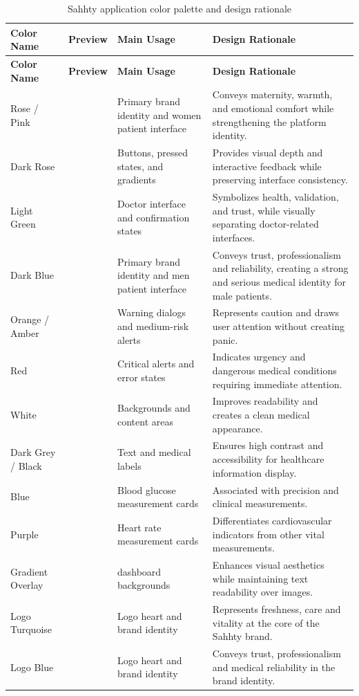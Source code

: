 \begin{longtable}{|p{2.5cm}|p{2cm}|p{3.5cm}|p{5.5cm}|}
\caption{Sahhty application color palette and design rationale}
\label{tab:colors} \\
\hline
\rowcolor{pink!15}
\textbf{Color Name} & \textbf{Preview} & \textbf{Main Usage} & \textbf{Design Rationale} \\
\hline
\endfirsthead
\hline
\rowcolor{pink!15}
\textbf{Color Name} & \textbf{Preview} & \textbf{Main Usage} & \textbf{Design Rationale} \\
\hline
\endhead
Rose / Pink &
\cellcolor[HTML]{E91E8C} &
Primary brand identity and women patient interface &
Conveys maternity, warmth, and emotional comfort while strengthening the platform identity. \\
\hline
Dark Rose &
\cellcolor[HTML]{C2185B} &
Buttons, pressed states, and gradients &
Provides visual depth and interactive feedback while preserving interface consistency. \\
\hline
Light Green &
\cellcolor[HTML]{A5D6A7} &
Doctor interface and confirmation states &
Symbolizes health, validation, and trust, while visually separating doctor-related interfaces. \\
\hline
Dark Blue &
\cellcolor[HTML]{0D47A1} &
Primary brand identity and men patient interface &
Conveys trust, professionalism and reliability, creating a strong and serious medical identity for male patients. \\
\hline
Orange / Amber &
\cellcolor[HTML]{FFB300} &
Warning dialogs and medium-risk alerts &
Represents caution and draws user attention without creating panic. \\
\hline
Red &
\cellcolor[HTML]{E53935} &
Critical alerts and error states &
Indicates urgency and dangerous medical conditions requiring immediate attention. \\
\hline
White &
\cellcolor[HTML]{FFFFFF} &
Backgrounds and content areas &
Improves readability and creates a clean medical appearance. \\
\hline
Dark Grey / Black &
\cellcolor[HTML]{424242} &
Text and medical labels &
Ensures high contrast and accessibility for healthcare information display. \\
\hline
Blue &
\cellcolor[HTML]{42A5F5} &
Blood glucose measurement cards &
Associated with precision and clinical measurements. \\
\hline
Purple &
\cellcolor[HTML]{8E24AA} &
Heart rate measurement cards &
Differentiates cardiovascular indicators from other vital measurements. \\
\hline
Gradient Overlay &
\cellcolor[HTML]{D1C4E9} &
dashboard backgrounds &
Enhances visual aesthetics while maintaining text readability over images. \\
\hline
Logo Turquoise &
\cellcolor[HTML]{4DB6AC} &
Logo heart and brand identity &
Represents freshness, care and vitality at the core of the Sahhty brand. \\
\hline
Logo Blue &
\cellcolor[HTML]{1E88E5} &
Logo heart and brand identity &
Conveys trust, professionalism and medical reliability in the brand identity. \\
\hline
\end{longtable}
